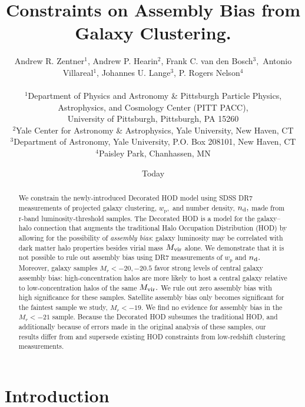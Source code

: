 \documentclass[usenatbib,usegraphicx,letterpaper]{mn2e}
\title[Clustering Constraints on Assembly Bias]
{
Constraints on Assembly Bias from Galaxy Clustering. 
}
\author[Zentner et al.]
{Andrew R. Zentner$^{1}$, Andrew P. Hearin$^{2}$, Frank C. van den Bosch$^{3},$ \newauthor
Antonio Villareal$^{1}$, Johannes U. Lange$^{3}$, P. Rogers Nelson$^{4}$\\ \\
$^1$Department of Physics and Astronomy \& Pittsburgh Particle Physics, Astrophysics, and Cosmology Center (PITT PACC),\\ University of Pittsburgh, Pittsburgh, PA 15260\\
$^2$Yale Center for Astronomy \& Astrophysics, Yale University, New Haven, CT\\
$^3$Department of Astronomy, Yale University, P.O. Box 208101, New Haven, CT\\
$^4$Paisley Park, Chanhassen, MN\\
}
\date{Today}
\newcommand{\mvir}{M_{\rm vir}}
\newcommand{\wprp}{w_{\mathrm{p}}}
\newcommand{\magr}{M_r}
\begin{document}
\maketitle
\begin{abstract}
We constrain the newly-introduced Decorated HOD model using SDSS DR7 measurements of projected galaxy clustering, $\wprp,$ and number density, $n_{\rm d},$ made from r-band luminosity-threshold samples. The Decorated HOD is a model for the galaxy--halo connection that augments the traditional Halo Occupation Distribution (HOD) by allowing for the possibility of {\em assembly bias}: galaxy luminosity may be correlated with dark matter halo properties besides virial mass $\mvir$ alone. We demonstrate that it is not possible to rule out assembly bias using DR7 measurements of $\wprp$ and $n_{\rm d}.$ Moreover, galaxy samples $\magr<-20, -20.5$ favor strong levels of central galaxy assembly bias: high-concentration halos are more likely to host a central galaxy relative to low-concentration halos of the same $\mvir.$ We rule out zero assembly bias with high significance for these samples. Satellite assembly bias only becomes significant for the faintest sample we study, $\magr<-19.$ We find no evidence for assembly bias in the $\magr<-21$ sample. Because the Decorated HOD subsumes the traditional HOD, and additionally because of errors made in the original analysis of these samples, our results differ from and supersede existing HOD constraints from low-redshift clustering measurements. 
\end{abstract} 

\section{Introduction}
\label{section:introduction}
\end{document}
